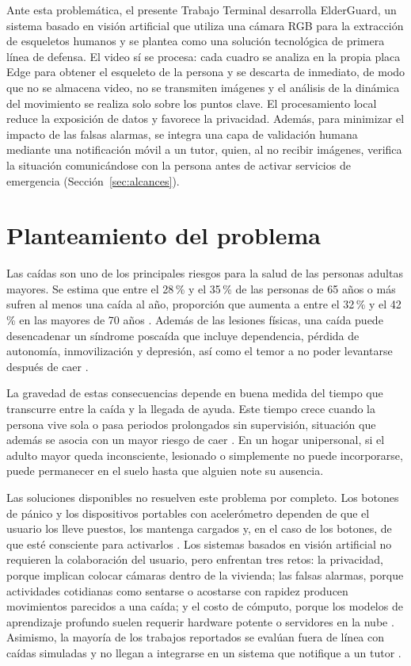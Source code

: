 \documentclass[12pt,a4paper,oneside]{book}
\theoremstyle{plain}
\theoremstyle{definition}
\theoremstyle{remark}
\begin{document}
Ante esta problemática, el presente Trabajo Terminal desarrolla ElderGuard, un sistema basado en visión artificial que utiliza una cámara RGB para la extracción de esqueletos humanos y se plantea como una solución tecnológica de primera línea de defensa. El video sí se procesa: cada cuadro se analiza en la propia placa Edge para obtener el esqueleto de la persona y se descarta de inmediato, de modo que no se almacena video, no se transmiten imágenes y el análisis de la dinámica del movimiento se realiza solo sobre los puntos clave. El procesamiento local reduce la exposición de datos y favorece la privacidad. Además, para minimizar el impacto de las falsas alarmas, se integra una capa de validación humana mediante una notificación móvil a un tutor, quien, al no recibir imágenes, verifica la situación comunicándose con la persona antes de activar servicios de emergencia (Sección~\ref{sec:alcances}).

\section{Planteamiento del problema}
Las caídas son uno de los principales riesgos para la salud de las personas adultas mayores. Se estima que entre el 28\,\% y el 35\,\% de las personas de 65 años o más sufren al menos una caída al año, proporción que aumenta a entre el 32\,\% y el 42\,\% en las mayores de 70 años \parencite{who2008falls}. Además de las lesiones físicas, una caída puede desencadenar un síndrome poscaída que incluye dependencia, pérdida de autonomía, inmovilización y depresión, así como el temor a no poder levantarse después de caer \parencite{who2008falls}.
 
La gravedad de estas consecuencias depende en buena medida del tiempo que transcurre entre la caída y la llegada de ayuda. Este tiempo crece cuando la persona vive sola o pasa periodos prolongados sin supervisión, situación que además se asocia con un mayor riesgo de caer \parencite{who2008falls}. En un hogar unipersonal, si el adulto mayor queda inconsciente, lesionado o simplemente no puede incorporarse, puede permanecer en el suelo hasta que alguien note su ausencia.
 
Las soluciones disponibles no resuelven este problema por completo. Los botones de pánico y los dispositivos portables con acelerómetro dependen de que el usuario los lleve puestos, los mantenga cargados y, en el caso de los botones, de que esté consciente para activarlos \parencite{igual2013challenges}. Los sistemas basados en visión artificial no requieren la colaboración del usuario, pero enfrentan tres retos: la privacidad, porque implican colocar cámaras dentro de la vivienda; las falsas alarmas, porque actividades cotidianas como sentarse o acostarse con rapidez producen movimientos parecidos a una caída; y el costo de cómputo, porque los modelos de aprendizaje profundo suelen requerir hardware potente o servidores en la nube \parencite{alam2022review}. Asimismo, la mayoría de los trabajos reportados se evalúan fuera de línea con caídas simuladas y no llegan a integrarse en un sistema que notifique a un tutor \parencite{igual2013challenges,alam2022review}.
 
\end{document}

